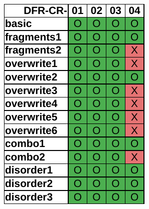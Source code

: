 \begin{figure}
\begin{subfigure}[b]{0.3\linewidth}
        \includegraphics[width=\linewidth]{fig/testdisk_results_fat.pdf}
    \end{subfigure}~~
    \begin{subfigure}[b]{0.3\linewidth}

\end{subfigure}
\end{figure}
